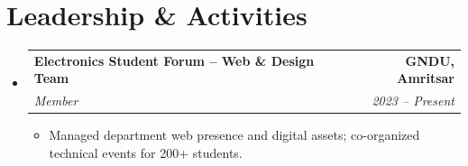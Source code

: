 \documentclass[letterpaper,10.5pt]{article}
\makeatletter
\newcommand{\resumeItem}[1]{\item\small{#1 \vspace{-2pt}}}
\newcommand{\resumeSubheading}[4]{
  \vspace{-2pt}\item
    \begin{tabular*}{1.0\textwidth}[t]{l@{\extracolsep{\fill}}r}
      \textbf{#1} & \textbf{\small #2} \\
      \textit{\small#3} & \textit{\small #4} \\
    \end{tabular*}\vspace{-6pt}
}
\newcommand{\resumeSubHeadingListStart}{\begin{itemize}[leftmargin=0.0in, label={}]}
\newcommand{\resumeSubHeadingListEnd}{\end{itemize}}
\newcommand{\resumeItemListStart}{\begin{itemize}[leftmargin=0.15in]}
\newcommand{\resumeItemListEnd}{\end{itemize}\vspace{-4pt}}
\makeatother
\begin{document}
\vspace{-4pt}

\section{Leadership \& Activities}
  \resumeSubHeadingListStart
    \resumeSubheading
      {Electronics Student Forum -- Web \& Design Team}{GNDU, Amritsar}
      {Member}{2023 -- Present}
      \resumeItemListStart
        \resumeItem{Managed department web presence and digital assets; co-organized technical events for 200+ students.}
      \resumeItemListEnd
  \resumeSubHeadingListEnd
\end{document}
